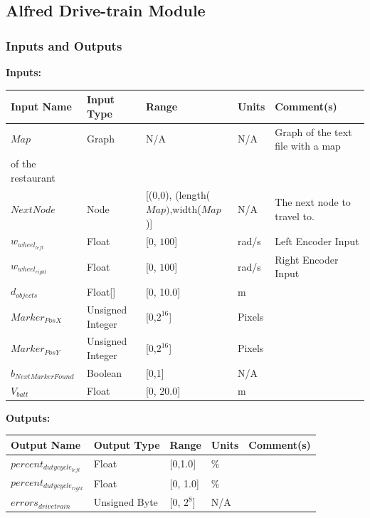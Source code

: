 \documentclass [10pt]{article}
\begin{document}
\subsection{Alfred Drive-train Module}

\subsubsection{Inputs and Outputs}

\textbf{Inputs: } 


\begin{longtable}{|l|l|l|l|l|}\hline 
	\rowcolor{tableCell}Input Name & Input Type & Range & Units & Comment(s) \\ \hline
	$ Map $ & Graph & N/A & N/A & Graph of the text file with a map \\ of the restaurant \\ \hline
	$ NextNode $ & Node & [(0,0), (length($Map)$,width($Map$)] & N/A & The next node to travel to. \\ \hline
	$ w_{wheel_{left}} $ & Float & [0, $ 100 $]& rad/s &  Left Encoder Input\\ \hline
	$ w_{wheel_{right}} $ & Float & [0, $ 100 $]& rad/s & Right Encoder Input  \\ \hline
	$  d_{objects} $ & Float[] & [0, 10.0]& m &  \\ \hline
	$ Marker_{PosX} $ & Unsigned Integer & [0,$2^{16}$] & Pixels &  \\ \hline
	$ Marker_{PosY} $ & Unsigned Integer & [0,$2^{16}$] & Pixels & \\ \hline
	$ b_{NextMarkerFound} $ & Boolean & [0,1] & N/A & \\ \hline
	$  V_{batt} $ & Float & [0, 20.0]& m &  \\ \hline
\end{longtable}


\textbf{Outputs: } 
\begin{longtable}{|l|l|l|l|l|}\hline 
	\rowcolor{tableCell}Output Name & Output Type & Range & Units & Comment(s) \\ \hline
	$ percent_{dutycycle_{left}} $ & Float & [0,1.0] & \% &  \\ \hline
	$ percent_{dutycycle_{right}} $ & Float & [0, 1.0]& \% & \\ \hline
	$ errors_{drivetrain} $ & Unsigned Byte & [0, $2^{8}$]& N/A & \\ \hline
\end{longtable}
\end{document}
